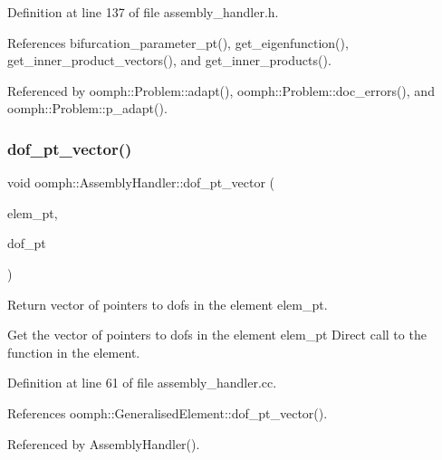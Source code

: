 Definition at line 137 of file assembly\+\_\+handler.\+h.



References bifurcation\+\_\+parameter\+\_\+pt(), get\+\_\+eigenfunction(), get\+\_\+inner\+\_\+product\+\_\+vectors(), and get\+\_\+inner\+\_\+products().



Referenced by oomph\+::\+Problem\+::adapt(), oomph\+::\+Problem\+::doc\+\_\+errors(), and oomph\+::\+Problem\+::p\+\_\+adapt().

\mbox{\label{classoomph_1_1AssemblyHandler_ac4ea8b24799a4d71e74c195ba85500ee}} 
\subsubsection{\texorpdfstring{dof\+\_\+pt\+\_\+vector()}{dof\_pt\_vector()}}
{\footnotesize\ttfamily void oomph\+::\+Assembly\+Handler\+::dof\+\_\+pt\+\_\+vector (\begin{DoxyParamCaption}\item[{\hyperlink{classoomph_1_1GeneralisedElement}{Generalised\+Element} $\ast$const \&}]{elem\+\_\+pt,  }\item[{\hyperlink{classoomph_1_1Vector}{Vector}$<$ double $\ast$$>$ \&}]{dof\+\_\+pt }\end{DoxyParamCaption})\hspace{0.3cm}{\ttfamily [virtual]}}



Return vector of pointers to dofs in the element elem\+\_\+pt. 

Get the vector of pointers to dofs in the element elem\+\_\+pt Direct call to the function in the element. 

Definition at line 61 of file assembly\+\_\+handler.\+cc.



References oomph\+::\+Generalised\+Element\+::dof\+\_\+pt\+\_\+vector().



Referenced by Assembly\+Handler().

\mbox{\label{classoomph_1_1AssemblyHandler_abfd15243fce76ce8f1ea0248c700a3f4}} 
